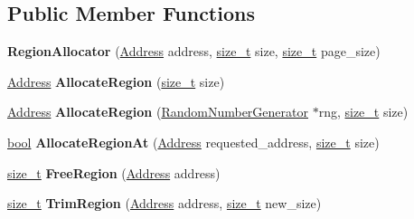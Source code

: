 \subsection*{Public Member Functions}
\begin{DoxyCompactItemize}
\item 
\mbox{\label{classv8_1_1base_1_1RegionAllocator_a16ab971ebf2050879550de8fc7e443a5}} 
{\bfseries Region\+Allocator} (\mbox{\hyperlink{classuintptr__t}{Address}} address, \mbox{\hyperlink{classsize__t}{size\+\_\+t}} size, \mbox{\hyperlink{classsize__t}{size\+\_\+t}} page\+\_\+size)
\item 
\mbox{\label{classv8_1_1base_1_1RegionAllocator_a428036fd1bb24d7a8f77d5d8142cf497}} 
\mbox{\hyperlink{classuintptr__t}{Address}} {\bfseries Allocate\+Region} (\mbox{\hyperlink{classsize__t}{size\+\_\+t}} size)
\item 
\mbox{\label{classv8_1_1base_1_1RegionAllocator_a8f15873bfe828fcba73829fff945806d}} 
\mbox{\hyperlink{classuintptr__t}{Address}} {\bfseries Allocate\+Region} (\mbox{\hyperlink{classv8_1_1base_1_1RandomNumberGenerator}{Random\+Number\+Generator}} $\ast$rng, \mbox{\hyperlink{classsize__t}{size\+\_\+t}} size)
\item 
\mbox{\label{classv8_1_1base_1_1RegionAllocator_af653f4debdf65b4fda8850478b795e66}} 
\mbox{\hyperlink{classbool}{bool}} {\bfseries Allocate\+Region\+At} (\mbox{\hyperlink{classuintptr__t}{Address}} requested\+\_\+address, \mbox{\hyperlink{classsize__t}{size\+\_\+t}} size)
\item 
\mbox{\label{classv8_1_1base_1_1RegionAllocator_acd3b53ae0790f516aab692b5cc840012}} 
\mbox{\hyperlink{classsize__t}{size\+\_\+t}} {\bfseries Free\+Region} (\mbox{\hyperlink{classuintptr__t}{Address}} address)
\item 
\mbox{\label{classv8_1_1base_1_1RegionAllocator_a9bf2ee5d09b644e87306cc0628b8abf8}} 
\mbox{\hyperlink{classsize__t}{size\+\_\+t}} {\bfseries Trim\+Region} (\mbox{\hyperlink{classuintptr__t}{Address}} address, \mbox{\hyperlink{classsize__t}{size\+\_\+t}} new\+\_\+size)
\item 

\end{DoxyCompactItemize}
